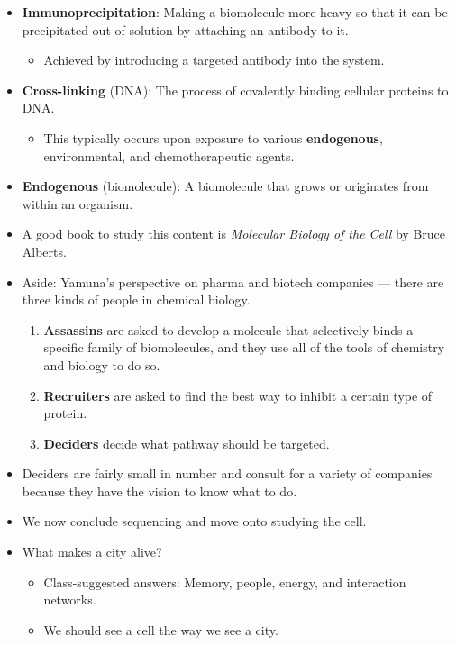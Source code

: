 \documentclass[../notes.tex]{subfiles}
\begin{document}
\begin{itemize}
    \item \textbf{Immunoprecipitation}: Making a biomolecule more heavy so that it can be precipitated out of solution by attaching an antibody to it.
    \begin{itemize}
        \item Achieved by introducing a targeted antibody into the system.
    \end{itemize}
    \item \textbf{Cross-linking} (DNA): The process of covalently binding cellular proteins to DNA.
    \begin{itemize}
        \item This typically occurs upon exposure to various \textbf{endogenous}, environmental, and chemotherapeutic agents.
    \end{itemize}
    \item \textbf{Endogenous} (biomolecule): A biomolecule that grows or originates from within an organism.
    \item A good book to study this content is \emph{Molecular Biology of the Cell} by Bruce Alberts.
    \item Aside: Yamuna's perspective on pharma and biotech companies --- there are three kinds of people in chemical biology.
    \begin{enumerate}
        \item \textbf{Assassins} are asked to develop a molecule that selectively binds a specific family of biomolecules, and they use all of the tools of chemistry and biology to do so.
        \item \textbf{Recruiters} are asked to find the best way to inhibit a certain type of protein.
        \item \textbf{Deciders} decide what pathway should be targeted.
    \end{enumerate}
    \item Deciders are fairly small in number and consult for a variety of companies because they have the vision to know what to do.
    \item We now conclude sequencing and move onto studying the cell.
    \item What makes a city alive?
    \begin{itemize}
        \item Class-suggested answers: Memory, people, energy, and interaction networks.
        \item We should see a cell the way we see a city.
    \end{itemize}

\end{itemize}
\end{document}
